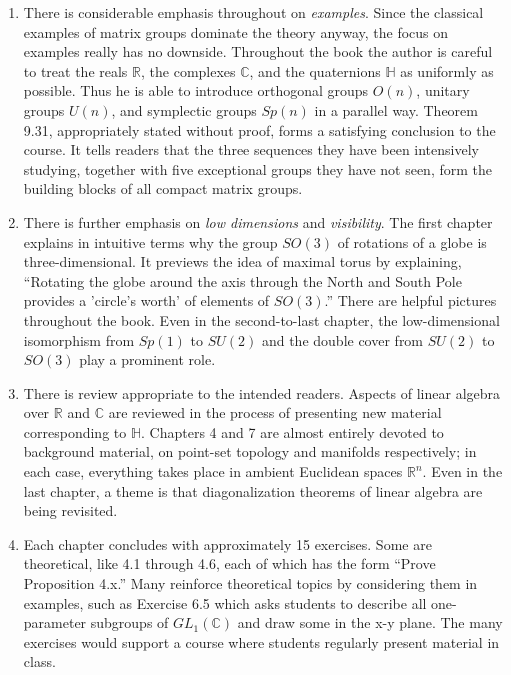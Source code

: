 \documentclass{article}
\begin{document}
\begin{enumerate}
  \item There is considerable emphasis throughout on \textit{examples}. Since the classical examples of matrix groups dominate the theory anyway, the focus on examples really has no downside. Throughout the book the author is careful to treat the reals $\mathbb{R}$, the complexes $\mathbb{C}$, and the quaternions $\mathbb{H}$ as uniformly as possible. Thus he is able to introduce orthogonal groups $O(n)$, unitary groups $U(n)$, and symplectic groups $Sp(n)$ in a parallel way. Theorem 9.31, appropriately stated without proof, forms a satisfying conclusion to the course. It tells readers that the three sequences they have been intensively studying, together with five exceptional groups they have not seen, form the building blocks of all compact matrix groups.
  \item There is further emphasis on \textit{low dimensions} and \textit{visibility}. The first chapter explains in intuitive terms why the group $SO(3)$ of rotations of a globe is three-dimensional. It previews the idea of maximal torus by explaining, ``Rotating the globe around the axis through the North and South Pole provides a 'circle's worth' of elements of $SO(3)$.'' There are helpful pictures throughout the book. Even in the second-to-last chapter, the low-dimensional isomorphism from $Sp(1)$ to $SU(2)$ and the double cover from $SU(2)$ to $SO(3)$ play a prominent role.
  \item There is review appropriate to the intended readers. Aspects of linear algebra over $\mathbb{R}$ and $\mathbb{C}$ are reviewed in the process of presenting new material corresponding to $\mathbb{H}$. Chapters 4 and 7 are almost entirely devoted to background material, on point-set topology and manifolds respectively; in each case, everything takes place in ambient Euclidean spaces $\mathbb{R}^n$. Even in the last chapter, a theme is that diagonalization theorems of linear algebra are being revisited.
  \item Each chapter concludes with approximately 15 exercises. Some are theoretical, like 4.1 through 4.6, each of which has the form ``Prove Proposition 4.x.'' Many reinforce theoretical topics by considering them in examples, such as Exercise 6.5 which asks students to describe all one-parameter subgroups of $GL_{1}(\mathbb{C})$ and draw some in the x-y plane. The many exercises would support a course where students regularly present material in class.
\end{enumerate}
\end{document}
